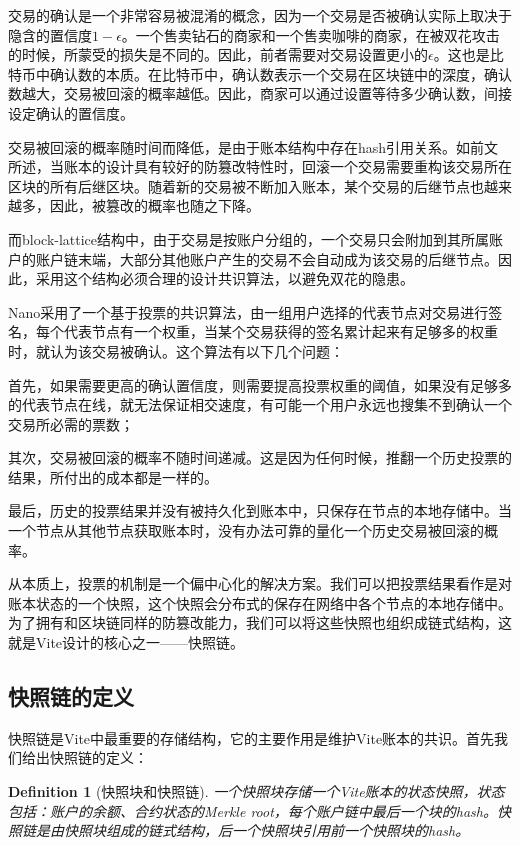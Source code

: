 \documentclass[UTF8,nofonts]{ctexart}
\newtheorem{definition}{Definition}[section]
\begin{document}
\begin{multicols}{2}
交易的确认是一个非常容易被混淆的概念，因为一个交易是否被确认实际上取决于隐含的置信度$1-\epsilon$。一个售卖钻石的商家和一个售卖咖啡的商家，在被双花攻击的时候，所蒙受的损失是不同的。因此，前者需要对交易设置更小的$\epsilon$。这也是比特币中确认数的本质。在比特币中，确认数表示一个交易在区块链中的深度，确认数越大，交易被回滚的概率越低\cite{nakamoto2008bitcoin}。因此，商家可以通过设置等待多少确认数，间接设定确认的置信度。

交易被回滚的概率随时间而降低，是由于账本结构中存在hash引用关系。如前文所述，当账本的设计具有较好的防篡改特性时，回滚一个交易需要重构该交易所在区块的所有后继区块。随着新的交易被不断加入账本，某个交易的后继节点也越来越多，因此，被篡改的概率也随之下降。

而block-lattice结构中，由于交易是按账户分组的，一个交易只会附加到其所属账户的账户链末端，大部分其他账户产生的交易不会自动成为该交易的后继节点。因此，采用这个结构必须合理的设计共识算法，以避免双花的隐患。

Nano采用了一个基于投票的共识算法\cite{nano}，由一组用户选择的代表节点对交易进行签名，每个代表节点有一个权重，当某个交易获得的签名累计起来有足够多的权重时，就认为该交易被确认。这个算法有以下几个问题：

首先，如果需要更高的确认置信度，则需要提高投票权重的阈值，如果没有足够多的代表节点在线，就无法保证相交速度，有可能一个用户永远也搜集不到确认一个交易所必需的票数；

其次，交易被回滚的概率不随时间递减。这是因为任何时候，推翻一个历史投票的结果，所付出的成本都是一样的。

最后，历史的投票结果并没有被持久化到账本中，只保存在节点的本地存储中。当一个节点从其他节点获取账本时，没有办法可靠的量化一个历史交易被回滚的概率。

从本质上，投票的机制是一个偏中心化的解决方案。我们可以把投票结果看作是对账本状态的一个快照，这个快照会分布式的保存在网络中各个节点的本地存储中。为了拥有和区块链同样的防篡改能力，我们可以将这些快照也组织成链式结构，这就是Vite设计的核心之一——快照链\cite{snapshotchain}。

\subsection{快照链的定义}
快照链是Vite中最重要的存储结构，它的主要作用是维护Vite账本的共识。首先我们给出快照链的定义：
\begin{definition}[快照块和快照链]
一个快照块存储一个Vite账本的状态快照，状态包括：账户的余额、合约状态的Merkle root，每个账户链中最后一个块的hash。快照链是由快照块组成的链式结构，后一个快照块引用前一个快照块的hash。
\end{definition}


\end{multicols}
\end{document}

